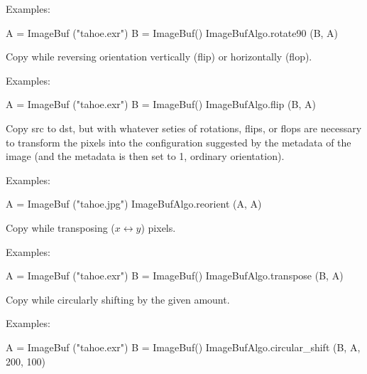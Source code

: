 \smallskip
\noindent Examples:
\begin{code}
    A = ImageBuf ("tahoe.exr")
    B = ImageBuf()
    ImageBufAlgo.rotate90 (B, A)
\end{code}
\apiend



 
 
Copy while reversing orientation vertically (flip) or horizontally (flop).

\smallskip
\noindent Examples:
\begin{code}
    A = ImageBuf ("tahoe.exr")
    B = ImageBuf()
    ImageBufAlgo.flip (B, A)
\end{code}
\apiend


 

Copy {\cf src} to {\cf dst}, but with whatever seties of rotations, flips,
or flops are necessary to transform the pixels into the configuration
suggested by the  metadata of the image (and the
 metadata is then set to 1, ordinary orientation).

\smallskip
\noindent Examples:
\begin{code}
    A = ImageBuf ("tahoe.jpg")
    ImageBufAlgo.reorient (A, A)
\end{code}
\apiend


 
Copy while transposing ($x \leftrightarrow y$) pixels.

\smallskip
\noindent Examples:
\begin{code}
    A = ImageBuf ("tahoe.exr")
    B = ImageBuf()
    ImageBufAlgo.transpose (B, A)
\end{code}
\apiend


 

Copy while circularly shifting by the given amount. 

\smallskip
\noindent Examples:
\begin{code}
    A = ImageBuf ("tahoe.exr")
    B = ImageBuf()
    ImageBufAlgo.circular_shift (B, A, 200, 100)
\end{code}
\apiend


